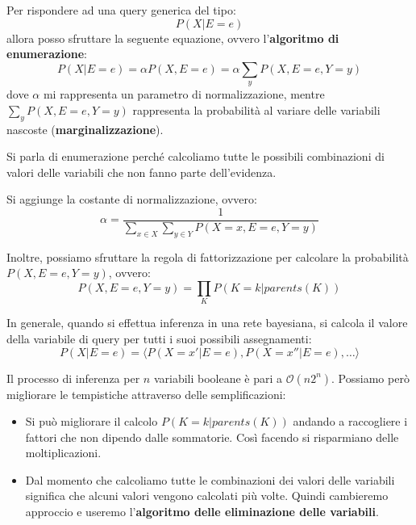 Per rispondere ad una query generica del tipo:
\begin{equation*}
    P(X|E=e)
\end{equation*}
allora posso sfruttare la seguente equazione, ovvero l'\textbf{algoritmo di
    enumerazione}:
\begin{equation}
    P(X|E = e) = \alpha P(X,E = e) = \alpha \sum_{y} P(X,E = e, Y = y)
\end{equation}
dove $\alpha$ mi rappresenta un parametro di normalizzazione, mentre $\sum_{y}
    P(X,E = e, Y = y)$ rappresenta la probabilità al variare delle variabili nascoste 
(\textbf{marginalizzazione}).

Si parla di enumerazione perché calcoliamo tutte le possibili combinazioni di valori
delle variabili che non fanno parte dell'evidenza.
\begin{nota}
    Si aggiunge la costante di normalizzazione, ovvero:
    \begin{equation}
        \alpha = \frac{1}{\sum_{x\in X}\sum_{y\in Y}P(X = x, E=e,Y=y)}
    \end{equation}
\end{nota}
Inoltre, possiamo sfruttare la regola di fattorizzazione per calcolare la probabilità
$P(X,E=e,Y=y)$, ovvero:
\begin{equation}
    P(X,E=e,Y=y) = \prod_{K} P(K=k | parents(K))
\end{equation}

In generale, quando si effettua inferenza in una rete bayesiana, si calcola il
valore della variabile di query per tutti i suoi possibili assegnamenti:
\begin{equation*}
    P(X|E=e) = \langle P(X = x'|E = e), P(X = x''|E = e),\dots \rangle
\end{equation*}

Il processo di inferenza per $n$ variabili booleane è pari a $\mathcal{O}(n2^n)$.
Possiamo però migliorare le tempistiche attraverso delle semplificazioni:
\begin{itemize}
    \item Si può migliorare il calcolo $P(K=k | parents(K))$ andando a raccogliere
          i fattori che non dipendo dalle sommatorie. Così facendo si risparmiano
          delle moltiplicazioni.
    \item Dal momento che calcoliamo tutte le combinazioni dei valori delle
          variabili significa che alcuni valori vengono calcolati più volte.
          Quindi cambieremo approccio e useremo l'\textbf{algoritmo delle
              eliminazione delle variabili}.
\end{itemize}

